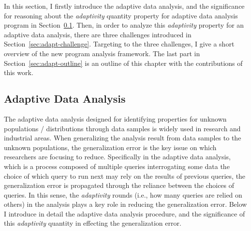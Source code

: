 In this section, 
I firstly introduce the adaptive data analysis, and the
significance for reasoning about the \emph{adaptivity} quantity property 
for adaptive data analysis program in Section~\ref{sec:adapt-background}.
Then, in order to analyze this \emph{adaptivity} property for an adaptive data analysis,
there are three challenges
introduced in Section~\ref{sec:adapt-challenge}.
Targeting to the three challenges, I give a short overview of the new program analysis framework.
The last part in Section~\ref{sec:adapt-outline} is an outline of this chapter with the contributions of this work.

 \subsection{Adaptive Data Analysis}
 \label{sec:adapt-background}
 The adaptive data analysis designed for identifying  properties for unknown populations / distributions 
 through data samples is widely 
 used in research and industrial areas.
 When generalizing the analysis result from data samples to the unknown populations, 
 the generalization error is the key issue on which researchers are focusing to reduce.
 Specifically in the adaptive data analysis,
 which is a process composed of 
 multiple queries interrogating some data
 the choice of which query to run next may rely on the results of previous queries,
 the generalization error is propagated through the reliance between the choices of queries.
 In this sense, the \emph{adaptivity} rounds (i.e., how many queries are relied on others) in the analysis plays a key role in reducing the generalization error.
 Below I introduce in detail the adaptive data analysis procedure,
 and the significance of this \emph{adaptivity} quantity in effecting the generalization error.
 
